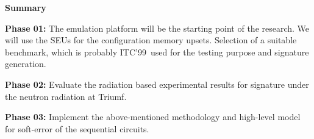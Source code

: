 \textbf{Summary}

\textbf{Phase  01:} The emulation platform will be the starting point of the research. We will use the SEUs for the configuration memory upsets. Selection of a suitable benchmark, which is probably ITC'99~\cite{ITC}used for the testing purpose and signature generation.

\textbf{Phase  02:} Evaluate the radiation based experimental results for signature under the neutron radiation at Triumf.


\textbf{Phase 03:} Implement the above-mentioned methodology and high-level model for soft-error of the sequential circuits.

%
%
%
%
%
